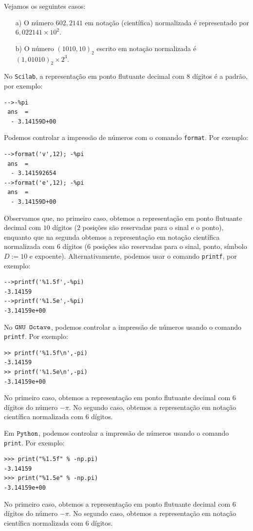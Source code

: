\begin{ex} Vejamos os seguintes casos:
  \begin{itemize}
  \item[a)] O número $602,2141$ em notação (científica) normalizada é representado por $6,022141\times 10^{2}$.
  \item[b)] O número $(1010,10)_2$ escrito em notação normalizada é $(1,01010)_2\times 2^3$.
  \end{itemize}
\end{ex}

\ifisscilab
\begin{obs}
No \verb+Scilab+, a representação em ponto flutuante decimal com $8$ dígitos é a padrão, por exemplo:
\begin{verbatim}
-->-%pi
 ans  =
  - 3.14159D+00 
\end{verbatim}
Podemos controlar a impressão de números com o comando \verb+format+. Por exemplo:
\begin{verbatim}
-->format('v',12); -%pi
 ans  =
  - 3.141592654  
-->format('e',12); -%pi
 ans  =
  - 3.14159D+00  
\end{verbatim}
Observamos que, no primeiro caso, obtemos a representação em ponto flutuante decimal com $10$ dígitos ($2$ posições são reservadas para o sinal e o ponto), enquanto que na segunda obtemos a representação em notação científica normalizada com $6$ dígitos ($6$ posições são reservadas para o sinal, ponto, símbolo $D := 10$ e expoente). Alternativamente, podemos usar o comando \verb+printf+, por exemplo:
\begin{verbatim}
-->printf('%1.5f',-%pi)
-3.14159 
-->printf('%1.5e',-%pi)
-3.14159e+00 
\end{verbatim}
\end{obs}
\fi
\ifisoctave
\begin{obs}
No $\verb+GNU Octave+$, podemos controlar a impressão de números usando o comando \verb+printf+. Por exemplo:
\begin{verbatim}
>> printf('%1.5f\n',-pi)
-3.14159
>> printf('%1.5e\n',-pi)
-3.14159e+00
\end{verbatim}
No primeiro caso, obtemos a representação em ponto flutuante decimal com $6$ dígitos do número $-\pi$. No segundo caso, obtemos a representação em notação científica normalizada com $6$ dígitos.  
\end{obs}
\fi
\ifispython
\begin{obs}
Em $\verb+Python+$, podemos controlar a impressão de números usando o comando \verb+print+. Por exemplo:
\begin{verbatim}
>>> print("%1.5f" % -np.pi)
-3.14159
>>> print("%1.5e" % -np.pi)
-3.14159e+00
\end{verbatim}
No primeiro caso, obtemos a representação em ponto flutuante decimal com $6$ dígitos do número $-\pi$. No segundo caso, obtemos a representação em notação científica normalizada com $6$ dígitos.  
\end{obs}
\fi

